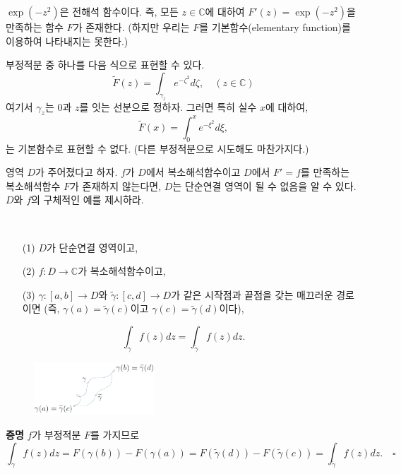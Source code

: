 \begin{saltexample}[label=example-3-10]{}{}
$\exp(-z^2)$은 전해석 함수이다.
즉, 모든 $z\in\mathbb C$에 대하여 $F'(z)= \exp(-z^2)$을 만족하는 함수 $F$가 존재한다.
(하지만 우리는 $F$를 기본함수(elementary function)를 이용하여 나타내지는 못한다.)

부정적분 중 하나를 다음 식으로 표현할 수 있다.
\[
\tilde F(z) = \int_{\gamma_z} e^{-\zeta^2} d\zeta, \quad (z\in\mathbb C)
\]
여기서 $\gamma_z$는 $0$과 $z$를 잇는 선분으로 정하자.
그러면 특히 실수 $x$에 대하여,
\[
\tilde F(x) = \int_0^x e^{-\xi^2} d\xi,
\]
는 기본함수로 표현할 수 없다.
(다른 부정적분으로 시도해도 마찬가지다.) 
\end{saltexample}

\begin{salt_exercise} \label{ex-3-23}
영역 $D$가 주어졌다고 하자.
$f$가 $D$에서 복소해석함수이고 $D$에서 $F'=f$를 만족하는
복소해석함수 $F$가 존재하지 않는다면,
$D$는 단순연결 영역이 될 수 없음을 알 수 있다.
$D$와 $f$의 구체적인 예를 제시하라.
\end{salt_exercise}

\begin{salt_corollary} \label{coro-3-3}
\
\begin{itemize}
\item[(1)] $D$가 단순연결 영역이고,
\item[(2)] $f:D\to\mathbb C$가 복소해석함수이고,
\item[(3)] $\gamma :[a,b] \to D$와 $\tilde\gamma :[c,d] \to D$가 
같은 시작점과 끝점을 갖는 매끄러운 경로이면
(즉, $\gamma(a) = \tilde\gamma(c)$이고 $\gamma(c) = \tilde\gamma(d)$이다),
\end{itemize}
\[
\int_\gamma f(z) dz = \int_{\tilde\gamma} f(z)dz.
\]
\end{salt_corollary}

\begin{figure}[h!]
\begin{center}
\includegraphics[width=0.4\textwidth]{./SaltChapter/figs/fig-3-0-6}
\end{center}
\end{figure}

{\bf 증명}
$f$가 부정적분 $F$를 가지므로
\[
\int_\gamma f(z) dz = F(\gamma(b)) - F(\gamma(a))
= F(\tilde\gamma(d)) - F(\tilde\gamma(c))
= \int_{\tilde\gamma} f(z)dz.
\quad \square
\]

